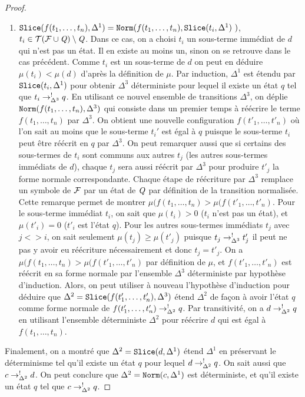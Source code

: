\begin{proof}
\begin{enumerate}
   \item $\mathtt{Slice}(f(t_1, \dots, t_n), \Delta^1) = \mathtt{Norm}(f(t_1,\dots, t_n), \mathtt{Slice}(t_i, \Delta^1)\ )$, $t_i \in \mathcal{ T(F \cup \mathit Q)} \setminus \mathit Q$.
     Dans ce cas, on a choisi $t_i$ un sous-terme immédiat de $d$ qui n'est pas un état. Il en existe au moins un, sinon on se retrouve dans le cas précédent.
     Comme $t_i$ est un sous-terme de $d$ on peut en déduire $\mu(t_i) < \mu(d)$ d'après la définition de $\mu$.
     Par induction, $\Delta^1$ est étendu par $\mathtt{Slice}(t_i, \Delta^1)$ pour obtenir $\Delta^3$ déterministe pour lequel il existe un état $q$ 
     tel que $t_i \rightarrow^!_{\Delta^3} q$. En utilisant ce nouvel ensemble de transitions $\Delta^3$, on déplie $\mathtt{Norm}(f(t_1,\dots, t_n), \Delta^3)$ 
     qui consiste dans un premier temps à réécrire le terme $f(t_1, \dots, t_n)$ par $\Delta^3$. On obtient une nouvelle configuration $f(t'_1, \dots, t'_n)$ où l'on sait
     au moins que le sous-terme $t_i'$ est égal à $q$ puisque le sous-terme $t_i$ peut être réécrit en $q$ par $\Delta^3$. On peut remarquer aussi
     que si certains des sous-termes de $t_i$ sont communs aux autres $t_j$ (les autres sous-termes immédiats de $d$), chaque $t_j$ sera aussi réécrit
     par $\Delta^3$ pour produire $t'_j$ la forme normale correspondante.
     Chaque étape de réécriture par $\Delta^3$ remplace un symbole de $\mathcal{F}$ par un état de $\mathit Q$ par définition de la transition normalisée.
     Cette remarque permet de montrer $\mu(f(t_1,\dots,t_n) > \mu(f(t'_1,\dots,t'_n)$.
     Pour le sous-terme immédiat $t_i$, on sait que $\mu(t_i) > 0$ ($t_i$ n'est pas un état), et $\mu(t'_i) = 0$ ($t'_i$ est l'état $q$).
     Pour les autres sous-termes immédiats $t_j$ avec $j <> i$, on sait seulement $\mu(t_j) \ge \mu(t'_j)$ puisque $t_j \rightarrow^!_{\Delta^3} t'_j$ 
     il peut ne pas y avoir eu réécriture nécessairement et donc $t_j = t'_j$.
     On a $\mu(f(t_1,\dots,t_n) > \mu(f(t'_1,\dots,t'_n)$ par définition de $\mu$, et $f(t'_1,\dots,t'_n)$ est réécrit en sa forme normale par 
     l'ensemble $\Delta^3$ déterministe par hypothèse d'induction.
     Alors, on peut utiliser à nouveau l'hypothèse d'induction pour déduire que $\Delta^2 = \mathtt{Slice}(f(t'_1,\dots,t'_n), \Delta^3)$
     étend $\Delta^2$ de façon à avoir l'état $q$ comme forme normale de $f(t'_1,\dots,t'_n) \rightarrow^!_{\Delta^2} q$.
     Par transitivité, on a  $d \rightarrow^!_{\Delta^2} q$ en utilisant l'ensemble déterministe $\Delta^2$ pour réécrire $d$ qui est égal à  $f(t_1, \dots, t_n)$.
   \end{enumerate}

   Finalement, on a montré que $\Delta^2 = \mathtt{Slice}(d, \Delta^1)$ étend $\Delta^1$ en préservant le déterminisme tel qu'il existe un état 
   $q$ pour lequel $d \rightarrow^!_{\Delta^2} q$. On sait aussi que $c \rightarrow^!_{\Delta^2} d$. On peut conclure que $\Delta^2 = \mathtt{Norm}(c, \Delta^1)$
   est déterministe, et qu'il existe un état $q$ tel que $c \rightarrow^!_{\Delta^2} q$.
 \end{proof}

